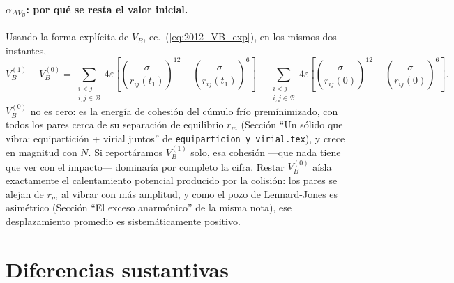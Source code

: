 \documentclass[11pt,a4paper]{article}
\newcommand{\eps}{\varepsilon}
\begin{document}
\paragraph{$\alpha_{\Delta V_B}$: por qué se resta el valor inicial.}
Usando la forma explícita de $V_B$, ec.~(\ref{eq:2012_VB_exp}), en los
mismos dos instantes,
\begin{equation}
V_B^{(1)}-V_B^{(0)} =
\sum_{\substack{i<j\\ i,j\in\mathcal B}}
4\eps\left[\left(\frac{\sigma}{r_{ij}(t_1)}\right)^{12}
-\left(\frac{\sigma}{r_{ij}(t_1)}\right)^{6}\right]
-\sum_{\substack{i<j\\ i,j\in\mathcal B}}
4\eps\left[\left(\frac{\sigma}{r_{ij}(0)}\right)^{12}
-\left(\frac{\sigma}{r_{ij}(0)}\right)^{6}\right].
\label{eq:avb_exp}
\end{equation}
$V_B^{(0)}$ no es cero: es la energía de cohesión del cúmulo frío
premínimizado, con todos los pares cerca de su separación de equilibrio
$r_m$ (Sección ``Un sólido que vibra: equipartición + virial juntos'' de
\texttt{equiparticion\_y\_virial.tex}), y crece en magnitud con $N$. Si
reportáramos $V_B^{(1)}$ solo, esa cohesión ---que nada tiene que ver con
el impacto--- dominaría por completo la cifra. Restar $V_B^{(0)}$ aísla
exactamente el calentamiento potencial producido por la colisión: los
pares se alejan de $r_m$ al vibrar con más amplitud, y como el pozo de
Lennard-Jones es asimétrico (Sección ``El exceso anarmónico'' de la misma
nota), ese desplazamiento promedio es sistemáticamente positivo.

\section{Diferencias sustantivas}
\label{sec:diferencias}
\end{document}
